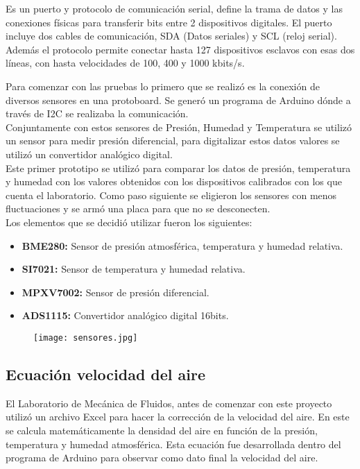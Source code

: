 
		\begin{tcolorbox}[colback=blue!5!white,colframe=blue!75!black,title=I2C]
			Es un puerto y protocolo de comunicación serial, define la trama de datos y las conexiones físicas para transferir bits entre 2 dispositivos digitales. El puerto incluye dos cables de comunicación, SDA (Datos seriales) y SCL (reloj serial). Además el protocolo permite conectar hasta 127 dispositivos esclavos con esas dos líneas, con hasta velocidades de 100, 400 y 1000 kbits/s. \end{tcolorbox}
Para comenzar con las pruebas lo primero que se realizó es la conexión de diversos sensores en una protoboard. Se generó un programa de Arduino dónde a través de I2C se realizaba la comunicación. \\ Conjuntamente con estos sensores de Presión, Humedad y Temperatura se utilizó un sensor para medir presión diferencial, para digitalizar estos datos valores se utilizó un convertidor analógico digital.\\
Este primer prototipo se utilizó para comparar los datos de presión, temperatura y humedad con los valores obtenidos con los dispositivos calibrados con los que cuenta el laboratorio.
Como paso siguiente se eligieron los sensores con menos fluctuaciones y se armó una placa para que no se desconecten.
\\
Los elementos que se decidió utilizar fueron los siguientes:
\begin{itemize}
	\item  \textbf{BME280:} Sensor de presión atmosférica, temperatura y humedad relativa.
	\item \textbf{SI7021:} Sensor de temperatura y humedad relativa.
	\item \textbf{MPXV7002:} Sensor de presión diferencial.
	\item \textbf{ADS1115:} Convertidor analógico digital 16bits.
\end{itemize}	

\begin{figure}[htb]
	\centering
	\texttt{[image: sensores.jpg]}
	\label{fig:sensoresa}
\end{figure}

\subsection{Ecuación velocidad del aire}
El Laboratorio de Mecánica de Fluidos, antes de comenzar con este proyecto utilizó un archivo Excel para hacer la corrección de la velocidad del aire. En este se calcula matemáticamente la densidad del aire en función de la presión, temperatura y humedad atmosférica. Esta ecuación fue desarrollada dentro del programa de Arduino para observar como dato final la velocidad del aire.

